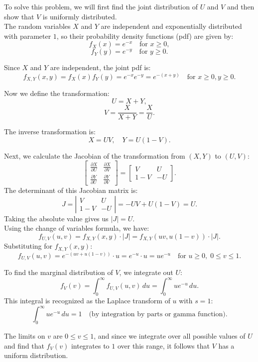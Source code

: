 \begin{solution}
To solve this problem, we will first find the joint distribution of \( U \) and \( V \) and then show that \( V \) is uniformly distributed.\\

The random variables \( X \) and \( Y \) are independent and exponentially distributed with parameter \( 1 \), so their probability density functions (pdf) are given by:
\[
f_X(x) = e^{-x} \quad \text{for } x \geq 0,
\]
\[
f_Y(y) = e^{-y} \quad \text{for } y \geq 0.
\]


Since \( X \) and \( Y \) are independent, the joint pdf is:
\[
f_{X,Y}(x,y) = f_X(x) f_Y(y) = e^{-x} e^{-y} = e^{-(x+y)} \quad \text{for } x \geq 0, y \geq 0.
\]

Now we define the transformation:
\[
U = X + Y,
\]
\[
V = \frac{X}{X + Y} = \frac{X}{U}.
\]

The inverse transformation is:
\[
X = UV, \quad Y = U(1 - V).
\]

Next, we calculate the Jacobian of the transformation from \( (X, Y) \) to \( (U, V) \):
\[
\begin{bmatrix}
\frac{\partial X}{\partial U} & \frac{\partial X}{\partial V} \\
\frac{\partial Y}{\partial U} & \frac{\partial Y}{\partial V}
\end{bmatrix}
=
\begin{bmatrix}
V & U \\
1 - V & -U
\end{bmatrix}.
\]
The determinant of this Jacobian matrix is:
\[
J = \left| \begin{array}{cc}
V & U \\
1 - V & -U
\end{array} \right| = -UV + U(1 - V) = U.
\]
Taking the absolute value gives us \( |J| = U \).\\

Using the change of variables formula, we have:
\[
f_{U,V}(u,v) = f_{X,Y}(x,y) \cdot |J| = f_{X,Y}(uv, u(1-v)) \cdot |J|.
\]
Substituting for \( f_{X,Y}(x,y) \):
\[
f_{U,V}(u,v) = e^{-(uv + u(1-v))} \cdot u = e^{-u} \cdot u = u e^{-u} \quad \text{for } u \geq 0, \; 0 \leq v \leq 1.
\]

To find the marginal distribution of \( V \), we integrate out \( U \):
\[
f_V(v) = \int_0^\infty f_{U,V}(u,v) \, du = \int_0^\infty u e^{-u} \, du.
\]
This integral is recognized as the Laplace transform of \( u \) with \( s = 1 \):
\[
\int_0^\infty u e^{-u} \, du = 1 \quad \text{(by integration by parts or gamma function)}.
\]

The limits on \( v \) are \( 0 \leq v \leq 1 \), and since we integrate over all possible values of \( U \) and find that \( f_V(v) \) integrates to \( 1 \) over this range, it follows that \( V \) has a uniform distribution.
\end{solution}
